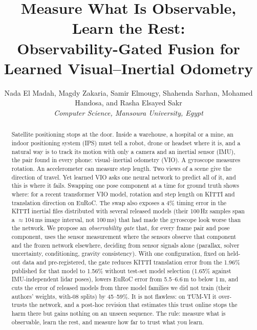 \documentclass[letterpaper,journal]{IEEEtran}
\begin{document}
\title{Measure What Is Observable, Learn the Rest:\\Observability-Gated Fusion for Learned Visual--Inertial Odometry}

\author{Nada El Madah, Magdy Zakaria, Samir Elmougy, Shahenda Sarhan, Mohamed Handosa, and Rasha Elsayed Sakr\\
\textit{Computer Science, Mansoura University, Egypt}}

\markboth{}{}

\maketitle

\begin{abstract}
Satellite positioning stops at the door. Inside a warehouse, a hospital or a mine, an indoor positioning system (IPS) must tell a robot, drone or headset where it is, and a natural way is to track its motion with only a camera and an inertial sensor (IMU), the pair found in every phone: visual--inertial odometry (VIO). A gyroscope measures rotation. An accelerometer can measure step length. Two views of a scene give the direction of travel. Yet learned VIO asks one neural network to predict all of it, and this is where it fails. Swapping one pose component at a time for ground truth shows where: for a recent transformer VIO model, rotation and step length on KITTI and translation direction on EuRoC. The swap also exposes a 4\% timing error in the KITTI inertial files distributed with several released models (their 100\,Hz samples span a $\approx$104\,ms image interval, not 100\,ms) that had made the gyroscope look worse than the network. We propose an \emph{observability gate} that, for every frame pair and pose component, uses the sensor measurement where the sensors observe that component and the frozen network elsewhere, deciding from sensor signals alone (parallax, solver uncertainty, conditioning, gravity consistency). With one configuration, fixed on held-out data and pre-registered, the gate reduces KITTI translation error from the 1.96\% published for that model to 1.56\% without test-set model selection (1.65\% against IMU-independent lidar poses), lowers EuRoC error from 5.5--6.6\,m to below 1\,m, and cuts the error of released models from three model families we did not train (their authors' weights, with-08 splits) by 45--59\%. It is not flawless: on TUM-VI it over-trusts the network, and a post-hoc revision that estimates this trust online stops the harm there but gains nothing on an unseen sequence. The rule: measure what is observable, learn the rest, and measure how far to trust what you learn.
\end{abstract}
\end{document}
